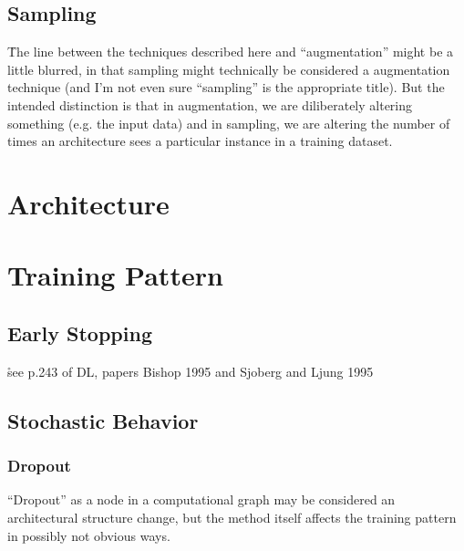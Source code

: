 \subsection{Sampling}

\r{The line between the techniques described here and ``augmentation'' might be a little blurred, in that sampling might technically be considered a augmentation technique (and I'm not even sure ``sampling'' is the appropriate title). But the intended distinction is that in augmentation, we are diliberately altering something (e.g. the input data) and in sampling, we are altering the number of times an architecture sees a particular instance in a training dataset.}




\section{Architecture}

\section{Training Pattern}

\subsection{Early Stopping}

\r{see p.243 of DL, papers Bishop 1995 and Sjoberg and Ljung 1995}



\subsection{Stochastic Behavior}

\subsubsection{Dropout}

\r{``Dropout'' as a node in a computational graph may be considered an architectural structure change, but the method itself affects the training pattern in possibly not obvious ways. }



